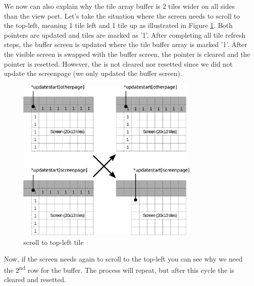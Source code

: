 \documentclass[book.tex]{subfiles}
\begin{document}
\pagebreak
We now can also explain why the tile array buffer is 2 tiles wider on all sides than the view port. Let's take the situation where the screen needs to scroll to the top-left, meaning 1 tile left and 1 tile up as illustrated in Figure \ref{fig:buffer_tile_move_1}. Both  pointers are updated and tiles are marked as '1'. After completing all tile refresh steps, the buffer screen is updated where the tile buffer array is marked '1'. After the visible screen is swapped with the buffer screen, the  pointer is cleared and the pointer is resetted. However, the  is not cleared nor resetted since we did not update the screenpage (we only updated the buffer screen).\\
\begin{figure}[H]
  \centering
  \includegraphics[width=0.8\textwidth]{imgs/drawings/buffer_tile_move_1.eps}
  \caption{scroll to top-left tile}
  \label{fig:buffer_tile_move_1}
\end{figure}
Now, if the screen needs again to scroll to the top-left you can see why we need the 2\textsuperscript{nd} row for the buffer. The process will repeat, but after this cycle the  is cleared and resetted.\\
\end{document}
